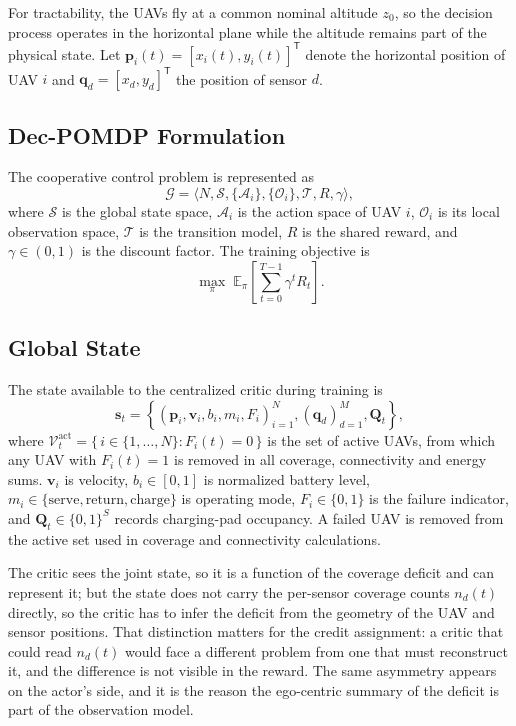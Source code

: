 \documentclass[conference]{IEEEtran}
\begin{document}
For tractability, the UAVs fly at a common nominal altitude $z_0$, so the decision process operates in the horizontal plane while the altitude remains part of the physical state. Let $\mathbf p_i(t)=[x_i(t),y_i(t)]^\mathsf{T}$ denote the horizontal position of UAV $i$ and $\mathbf q_d=[x_d,y_d]^\mathsf{T}$ the position of sensor $d$.

\subsection{Dec-POMDP Formulation}
The cooperative control problem is represented as
\begin{equation}
\mathcal G=\langle N,\mathcal S,\{\mathcal A_i\},\{\mathcal O_i\},\mathcal T, R,\gamma\rangle,
\label{eq:decpomdp}
\end{equation}
where $\mathcal S$ is the global state space, $\mathcal A_i$ is the action space of UAV $i$, $\mathcal O_i$ is its local observation space, $\mathcal T$ is the transition model, $R$ is the shared reward, and $\gamma\in(0,1)$ is the discount factor. The training objective is
\begin{equation}
\max_{\pi}\;\mathbb E_{\pi}\left[\sum_{t=0}^{T-1}\gamma^t R_t\right].
\label{eq:objective}
\end{equation}

\subsection{Global State}
The state available to the centralized critic during training is
\begin{equation}
\mathbf s_t=\left\{(\mathbf p_i,\mathbf v_i,b_i,m_i,F_i)_{i=1}^{N},(\mathbf q_d)_{d=1}^{M},\mathbf Q_t\right\},
\label{eq:state}
\end{equation}
where $\mathcal{V}_t^{\mathrm{act}}=\{\,i\in\{1,\dots,N\}:F_i(t)=0\,\}$ is the set of active UAVs, from which any UAV with $F_i(t)=1$ is removed in all coverage, connectivity and energy sums. $\mathbf v_i$ is velocity, $b_i\in[0,1]$ is normalized battery level, $m_i\in\{\mathrm{serve},\mathrm{return},\mathrm{charge}\}$ is operating mode, $F_i\in\{0,1\}$ is the failure indicator, and $\mathbf Q_t\in\{0,1\}^{S}$ records charging-pad occupancy. A failed UAV is removed from the active set used in coverage and connectivity calculations.

The critic sees the joint state, so it is a function of the coverage deficit and can represent it; but the state does not carry the per-sensor coverage counts $n_d(t)$ directly, so the critic has to infer the deficit from the geometry of the UAV and sensor positions. That distinction matters for the credit assignment: a critic that could read $n_d(t)$ would face a different problem from one that must reconstruct it, and the difference is not visible in the reward. The same asymmetry appears on the actor's side, and it is the reason the ego-centric summary of the deficit is part of the observation model.
\end{document}

